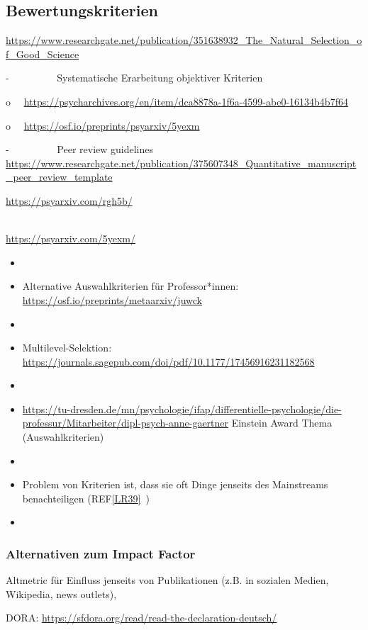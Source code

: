\documentclass[
  letterpaper,
  DIV=11,
  numbers=noendperiod]{scrreprt}
\begin{document}
\subsection{Bewertungskriterien}\label{bewertungskriterien}

\url{https://www.researchgate.net/publication/351638932_The_Natural_Selection_of_Good_Science}

-~~~~~~~~~ Systematische Erarbeitung objektiver Kriterien

o~~
\url{https://psycharchives.org/en/item/dca8878a-1f6a-4599-abe0-16134b4b7f64}

o~~ \url{https://osf.io/preprints/psyarxiv/5yexm}

-~~~~~~~~~ Peer review guidelines
\url{https://www.researchgate.net/publication/375607348_Quantitative_manuscript_peer_review_template}

\url{https://psyarxiv.com/rgh5b/}\strut \\
\url{https://psyarxiv.com/5yexm/}

\begin{itemize}
\item
\item
  Alternative Auswahlkriterien für Professor*innen:
  \url{https://osf.io/preprints/metaarxiv/juwck}
\item
\item
  Multilevel-Selektion:
  \url{https://journals.sagepub.com/doi/pdf/10.1177/17456916231182568}
\item
\item
  \url{https://tu-dresden.de/mn/psychologie/ifap/differentielle-psychologie/die-professur/Mitarbeiter/dipl-psych-anne-gaertner}
  Einstein Award Thema (Auswahlkriterien)
\item
\item
  Problem von Kriterien ist, dass sie oft Dinge jenseits des Mainstreams
  benachteiligen (REF\hyperref[_msocom_39]{{[}LR39{]}}~)
\item
\end{itemize}

\subsubsection{Alternativen zum Impact
Factor}\label{alternativen-zum-impact-factor}

Altmetric für Einfluss jenseits von Publikationen (z.B. in sozialen
Medien, Wikipedia, news outlets),

DORA: \url{https://sfdora.org/read/read-the-declaration-deutsch/}
\end{document}
